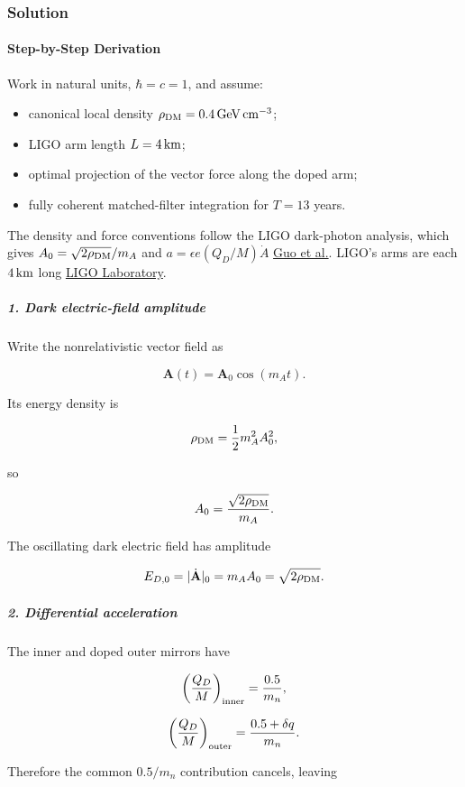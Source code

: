\subsubsection*{Solution}
\paragraph*{Step-by-Step Derivation}

Work in natural units, $\hbar=c=1$, and assume:

\begin{itemize}[leftmargin=*]
\item canonical local density $\rho_{\rm DM}=0.4\,{\rm GeV\,cm^{-3}}$;
\item LIGO arm length $L=4\,{\rm km}$;
\item optimal projection of the vector force along the doped arm;
\item fully coherent matched-filter integration for $T=13$ years.
\end{itemize}

The density and force conventions follow the LIGO dark-photon analysis, which gives $A_0=\sqrt{2\rho_{\rm DM}}/m_A$ and $a=\epsilon e(Q_D/M)\dot A$ \href{\detokenize{https://arxiv.org/abs/1905.04316}}{Guo et al.}. LIGO's arms are each $4\,{\rm km}$ long \href{\detokenize{https://www.ligo.caltech.edu/page/ligo-gw-interferometer}}{LIGO Laboratory}.

\subparagraph*{1. Dark electric-field amplitude}

Write the nonrelativistic vector field as

\[
\mathbf A(t)=\mathbf A_0\cos(m_A t).
\]

Its energy density is

\[
\rho_{\rm DM}=\frac12 m_A^2 A_0^2,
\]

so

\[
A_0=\frac{\sqrt{2\rho_{\rm DM}}}{m_A}.
\]

The oscillating dark electric field has amplitude

\[
E_{D,0}=|\dot{\mathbf A}|_0=m_AA_0 =\sqrt{2\rho_{\rm DM}}.
\]

\subparagraph*{2. Differential acceleration}

The inner and doped outer mirrors have

\[
\left(\frac{Q_D}{M}\right)_{\rm inner} =\frac{0.5}{m_n},
\]

\[
\left(\frac{Q_D}{M}\right)_{\rm outer} =\frac{0.5+\delta q}{m_n}.
\]

Therefore the common $0.5/m_n$ contribution cancels, leaving


